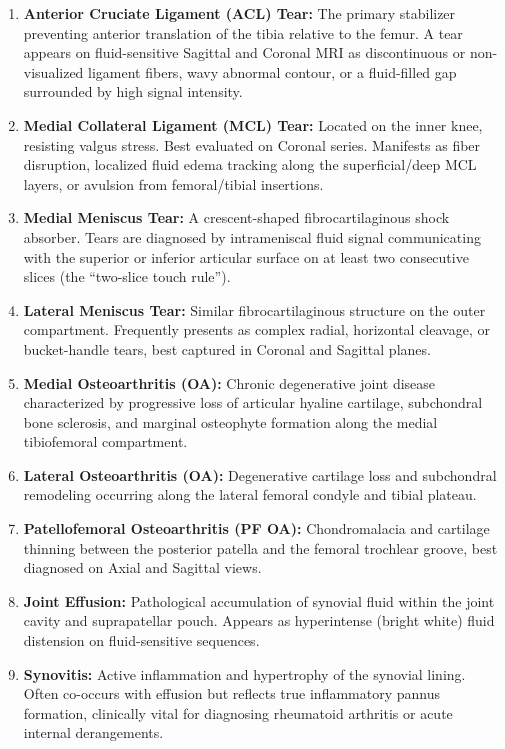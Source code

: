 \documentclass[11pt,a4paper]{article}
\begin{document}
\begin{enumerate}[leftmargin=*]
    \item \textbf{Anterior Cruciate Ligament (ACL) Tear:} The primary stabilizer preventing anterior translation of the tibia relative to the femur. A tear appears on fluid-sensitive Sagittal and Coronal MRI as discontinuous or non-visualized ligament fibers, wavy abnormal contour, or a fluid-filled gap surrounded by high signal intensity.
    \item \textbf{Medial Collateral Ligament (MCL) Tear:} Located on the inner knee, resisting valgus stress. Best evaluated on Coronal series. Manifests as fiber disruption, localized fluid edema tracking along the superficial/deep MCL layers, or avulsion from femoral/tibial insertions.
    \item \textbf{Medial Meniscus Tear:} A crescent-shaped fibrocartilaginous shock absorber. Tears are diagnosed by intrameniscal fluid signal communicating with the superior or inferior articular surface on at least two consecutive slices (the ``two-slice touch rule'').
    \item \textbf{Lateral Meniscus Tear:} Similar fibrocartilaginous structure on the outer compartment. Frequently presents as complex radial, horizontal cleavage, or bucket-handle tears, best captured in Coronal and Sagittal planes.
    \item \textbf{Medial Osteoarthritis (OA):} Chronic degenerative joint disease characterized by progressive loss of articular hyaline cartilage, subchondral bone sclerosis, and marginal osteophyte formation along the medial tibiofemoral compartment.
    \item \textbf{Lateral Osteoarthritis (OA):} Degenerative cartilage loss and subchondral remodeling occurring along the lateral femoral condyle and tibial plateau.
    \item \textbf{Patellofemoral Osteoarthritis (PF OA):} Chondromalacia and cartilage thinning between the posterior patella and the femoral trochlear groove, best diagnosed on Axial and Sagittal views.
    \item \textbf{Joint Effusion:} Pathological accumulation of synovial fluid within the joint cavity and suprapatellar pouch. Appears as hyperintense (bright white) fluid distension on fluid-sensitive sequences.
    \item \textbf{Synovitis:} Active inflammation and hypertrophy of the synovial lining. Often co-occurs with effusion but reflects true inflammatory pannus formation, clinically vital for diagnosing rheumatoid arthritis or acute internal derangements.

\end{enumerate}
\end{document}
